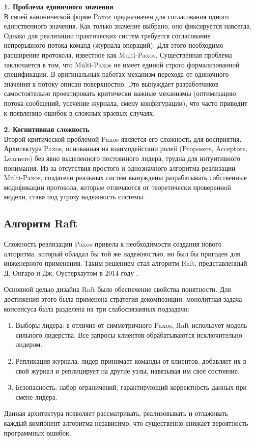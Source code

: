 \textbf{1. Проблема единичного значения} \\
В своей канонической форме Paxos предназначен для согласования одного единственного значения. Как только значение выбрано, оно фиксируется навсегда.
Однако для реализации практических систем требуется согласование непрерывного потока команд (журнала операций). Для этого необходимо расширение протокола, известное как Multi-Paxos.
Существенная проблема заключается в том, что Multi-Paxos не имеет единой строго формализованной спецификации. В оригинальных работах механизм перехода от одиночного значения к потоку описан поверхностно. Это вынуждает разработчиков самостоятельно проектировать критически важные механизмы (оптимизацию потока сообщений, усечение журнала, смену конфигурации), что часто приводит к появлению ошибок в сложных краевых случаях.

\textbf{2. Когнитивная сложность} \\
Второй критической проблемой Paxos является его сложность для восприятия. Архитектура Paxos, основанная на взаимодействии ролей (Proposers, Acceptors, Learners) без явно выделенного постоянного лидера, трудна для интуитивного понимания. Из-за отсутствия простого и однозначного алгоритма реализации Multi-Paxos, создатели реальных систем вынуждены разрабатывать собственные модификации протокола, которые отличаются от теоретически проверенной модели, ставя под угрозу надежность системы.

\subsection{Алгоритм Raft}

Сложность реализации Paxos привела к необходимости создания нового алгоритма, который обладал бы той же надежностью, но был бы пригоден для инженерного применения. Таким решением стал алгоритм Raft, представленный Д. Онгаро и Дж. Оустерхаутом в 2014 году \cite{raft_original}.

Основной целью дизайна Raft было обеспечение свойства понятности. Для достижения этого была применена стратегия декомпозиции: монолитная задача консенсуса была разделена на три слабосвязанных подзадачи:

\begin{enumerate}
    \item Выборы лидера: в отличие от симметричного Paxos, Raft использует модель сильного лидерства. Все запросы клиентов обрабатываются исключительно лидером.
    \item Репликация журнала: лидер принимает команды от клиентов, добавляет их в свой журнал и реплицирует на другие узлы, навязывая им своё состояние.
    \item Безопасность: набор ограничений, гарантирующий корректность данных при смене лидера.
\end{enumerate}

Данная архитектура позволяет рассматривать, реализовывать и отлаживать каждый компонент алгоритма независимо, что существенно снижает вероятность программных ошибок.
